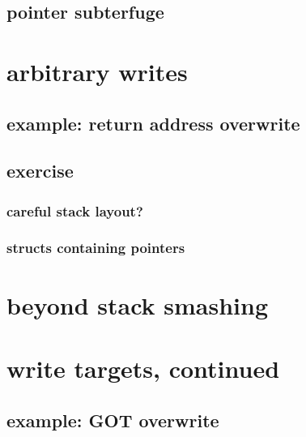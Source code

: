 \subsection{pointer subterfuge}


\section{arbitrary writes}



\subsection{example: return address overwrite}


\subsection{exercise}


\subsubsection{careful stack layout?}


\subsubsection{structs containing pointers}


\section{beyond stack smashing}




\section{write targets, continued}
\subsection{example: GOT overwrite}


